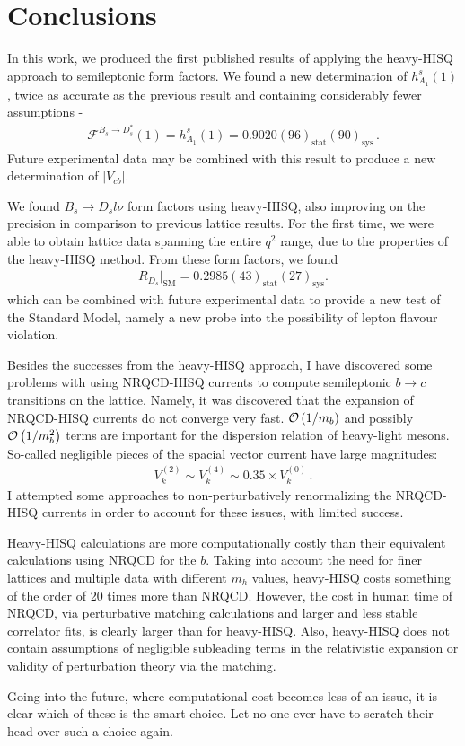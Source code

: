 ﻿\chapter{Conclusions}

In this work, we produced the first published results of applying the heavy-HISQ approach to semileptonic form factors. We found a new determination of $h_{A_1}^s(1)$, twice as accurate as the previous result and containing considerably fewer assumptions -
\begin{align}
  \mathcal{F}^{B_s\to D_s^*}(1) = h^s_{A_1}(1) = 0.9020(96)_{\text{stat}}(90)_{\text{sys}}\,.
\end{align}
Future experimental data may be combined with this result to produce a new determination of $|V_{cb}|$.

We found $B_s\to D_sl\nu$ form factors using heavy-HISQ, also improving on the precision in comparison to previous lattice results. For the first time, we were able to obtain lattice data spanning the entire $q^2$ range, due to the properties of the heavy-HISQ method. From these form factors, we found
\begin{align}
  R_{D_s}|_{\text{SM}} = 0.2985(43)_{\text{stat}}(27)_{\text{sys}}.
\end{align}
which can be combined with future experimental data to provide a new test of the Standard Model, namely a new probe into the possibility of lepton flavour violation.

Besides the successes from the heavy-HISQ approach, I have discovered some problems with using NRQCD-HISQ currents to compute semileptonic $b\to c$ transitions on the lattice. Namely, it was discovered that the expansion of NRQCD-HISQ currents do not converge very fast. $\mathcal{O}\left( 1/m_b \right)$ and possibly $\mathcal{O}\left( 1/m_b^2 \right)$ terms are important for the dispersion relation of heavy-light mesons. So-called negligible pieces of the spacial vector current have large magnitudes:
\begin{align}
  V_k^{(2)}\sim V_k^{(4)} \sim 0.35\times V_k^{(0)}\,.
\end{align}
I attempted some approaches to non-perturbatively renormalizing the NRQCD-HISQ currents in order to account for these issues, with limited success. 


Heavy-HISQ calculations are more computationally costly than their equivalent calculations using NRQCD for the $b$. Taking into account the need for finer lattices and multiple data with different $m_h$ values, heavy-HISQ costs something of the order of 20 times more than NRQCD. However, the cost in human time of NRQCD, via perturbative matching calculations and larger and less stable correlator fits, is clearly larger than for heavy-HISQ. Also, heavy-HISQ does not contain assumptions of negligible subleading terms in the relativistic expansion or validity of perturbation theory via the matching.

Going into the future, where computational cost becomes less of an issue, it is clear which of these is the smart choice. Let no one ever have to scratch their head over such a choice again.
